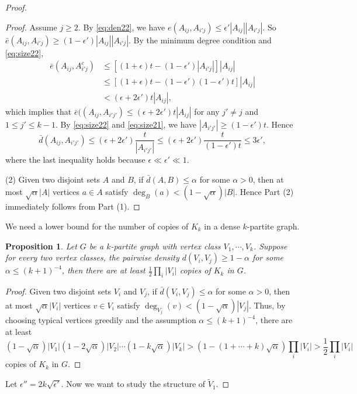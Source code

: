 \documentclass[reqno]{amsart}
\theoremstyle{plain}
\newtheorem{proposition}[theorem]{Proposition}
\def\a{\alpha}
\def\eps{\epsilon}
\begin{document}
\begin{proof}
\begin{proof}
Assume $j\ge 2$. By \eqref{eq:den22}, we have $e(A_{ij}, A_{i'j})\le \eps' |A_{ij}| |A_{i'j}|$.  So $\bar{e}( A_{ij}, A_{i'j})\ge (1 - \eps')|A_{ij}| |A_{i'j}|$. By the minimum degree condition and \eqref{eq:size22},
\begin{align*}
\bar{e}(A_{ij}, A_{i'j}^c) & \le [(1+\eps)t - (1-\eps')|A_{i'j}|] |A_{ij}| \\
& \le [(1+\eps)t - (1-\eps') (1- \eps')t] |A_{ij}| \\
& < (\eps + 2\eps') t |A_{ij}|,
\end{align*}
which implies that $\bar{e}((A_{ij}, A_{i'j'}) \le  (\eps + 2\eps') t |A_{ij}|$ for any $j' \ne j$ and $1\le j' \le k-1$. By \eqref{eq:size22} and \eqref{eq:size21}, we have $|A_{i'j'}|\ge (1- \eps')t$. Hence
\[
\bar{d}(A_{ij}, A_{i'j'})\le (\eps + 2\eps') \frac{t}{|A_{i'j'}|}\le (\eps + 2\eps') \frac{t}{(1- \eps')t} \le 3\eps',
\]
where the last inequality holds because $\eps \ll \eps' \ll 1$.

(2) Given two disjoint sets $A$ and $B$, if $\bar{d}(A, B)\le \alpha$ for some $\alpha>0$,  then at most $\sqrt{\alpha} |A|$ vertices $a\in A$ satisfy $\deg_B (a) < (1 - \sqrt{\alpha}) |B|$. Hence Part (2) immediately follows from Part (1).
\end{proof}

We need a lower bound for the number of copies of $K_k$ in a dense $k$-partite graph.
\begin{proposition}\label{clm:kk}
Let $G$ be a $k$-partite graph with vertex class $V_1, \cdots, V_k$. Suppose for every two vertex classes, the pairwise density $d(V_i, V_j)\ge 1 - \a$ for some $\a \le (k+1)^{-4}$, then there are at least $\frac12\prod_i |V_i|$ copies of $K_k$ in $G$.
\end{proposition}

\begin{proof}
Given two disjoint sets $V_i$ and $V_j$, if $\bar{d}(V_i, V_j)\le \alpha$ for some $\alpha>0$,  then at most $\sqrt{\alpha} |V_i|$ vertices $v\in V_i$ satisfy $\deg_{V_j} (v) < (1 - \sqrt{\alpha}) |V_j|$. Thus, by choosing typical vertices greedily and the assumption $\a \le (k+1)^{-4}$, there are at least
\[
(1 - \sqrt{\alpha}) |V_1| (1 - 2\sqrt{\alpha}) |V_2| \cdots (1 - k\sqrt{\alpha}) |V_k| > (1 - (1+\cdots + k)\sqrt \a) \prod_i |V_i|> \frac12 \prod_i |V_i|
\]
copies of $K_k$ in $G$.
\end{proof}

\medskip

Let $\eps'' = 2k \sqrt{\eps'}$. Now we want to study the structure of $\tilde{V}_1$.


\end{proof}
\end{document}
